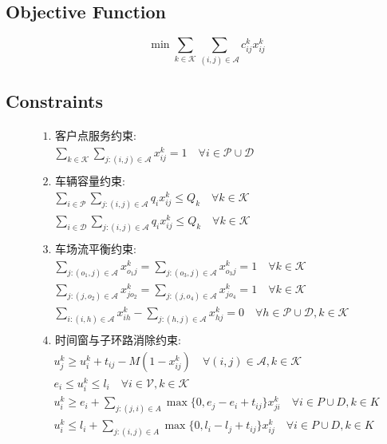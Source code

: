 \documentclass[11pt]{ctexart}
\begin{document}
\subsection*{Objective Function}
\[
\min \sum_{k \in \mathcal{K}} \sum_{(i,j) \in \mathcal{A}} c_{ij}^k x_{ij}^k
\]

\subsection*{Constraints}
\begin{align*}
& \text{1. 客户点服务约束:} \\
& \quad \sum_{k \in \mathcal{K}} \sum_{j: (i,j) \in \mathcal{A}} x_{ij}^k = 1 \quad \forall i \in \mathcal{P} \cup \mathcal{D} \\
\\
& \text{2. 车辆容量约束:} \\
& \quad \sum_{i \in \mathcal{P}} \sum_{j: (i,j) \in \mathcal{A}} q_i x_{ij}^k \le Q_k \quad \forall k \in \mathcal{K} \\
& \quad \sum_{i \in \mathcal{D}} \sum_{j: (i,j) \in \mathcal{A}} q_i x_{ij}^k \le Q_k \quad \forall k \in \mathcal{K} \\
\\
& \text{3. 车场流平衡约束:} \\
& \quad \sum_{j: (o_1, j) \in \mathcal{A}} x_{o_1 j}^k = \sum_{j: (o_3, j) \in \mathcal{A}} x_{o_3 j}^k = 1 \quad \forall k \in \mathcal{K} \\
& \quad \sum_{j: (j, o_2) \in \mathcal{A}} x_{j o_2}^k = \sum_{j: (j, o_4) \in \mathcal{A}} x_{j o_4}^k = 1 \quad \forall k \in \mathcal{K} \\
& \quad \sum_{i: (i, h) \in \mathcal{A}} x_{i h}^k - \sum_{j: (h, j) \in \mathcal{A}} x_{h j}^k = 0 \quad \forall h \in \mathcal{P} \cup \mathcal{D}, k \in \mathcal{K} \\
\\
& \text{4. 时间窗与子环路消除约束:} \\
& \quad u_j^k \ge u_i^k + t_{ij} - M(1 - x_{ij}^k) \quad \forall (i, j) \in \mathcal{A}, k \in \mathcal{K} \\
& \quad e_i \le u_i^k \le l_i \quad \forall i \in \mathcal{V}, k \in \mathcal{K} \\
& \quad u_i^k \ge e_i + \sum_{j: (j,i) \in A} \max\{0, e_j - e_i + t_{ij}\} x_{ji}^k \quad \forall i \in P \cup D, k \in K \\
& \quad u_i^k \le l_i + \sum_{j: (i,j) \in A} \max\{0, l_i - l_j + t_{ij}\} x_{ij}^k \quad \forall i \in P \cup D, k \in K \\

\end{align*}
\end{document}
